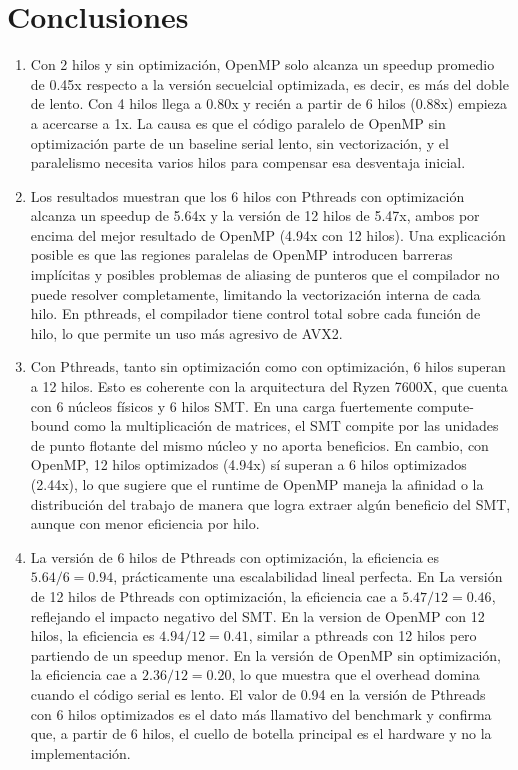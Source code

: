 
\section{Conclusiones}
\label{sec:Conclusiones}

\begin{enumerate}

 \item Con 2 hilos y sin optimización, OpenMP solo alcanza un speedup promedio de 0.45x respecto a la versión secuelcial optimizada, es decir, es más del doble de lento. Con 4 hilos llega a 0.80x y recién a partir de 6 hilos (0.88x) empieza a acercarse a 1x. La causa es que el código paralelo de OpenMP sin optimización parte de un baseline serial lento, sin vectorización, y el paralelismo necesita varios hilos para compensar esa desventaja inicial.

    \item Los resultados muestran que los 6 hilos con Pthreads con optimización alcanza un speedup de 5.64x y la versión de 12 hilos de 5.47x, ambos por encima del mejor resultado de OpenMP (4.94x con 12 hilos). Una explicación posible es que las regiones paralelas de OpenMP introducen barreras implícitas y posibles problemas de aliasing de punteros que el compilador no puede resolver completamente, limitando la vectorización interna de cada hilo. En pthreads, el compilador tiene control total sobre cada función de hilo, lo que permite un uso más agresivo de AVX2.

    \item Con Pthreads, tanto sin optimización como con optimización, 6 hilos superan a 12 hilos. Esto es coherente con la arquitectura del Ryzen 7600X, que cuenta con 6 núcleos físicos y 6 hilos SMT. En una carga fuertemente compute-bound como la multiplicación de matrices, el SMT compite por las unidades de punto flotante del mismo núcleo y no aporta beneficios. En cambio, con OpenMP, 12 hilos optimizados (4.94x) sí superan a 6 hilos optimizados (2.44x), lo que sugiere que el runtime de OpenMP maneja la afinidad o la distribución del trabajo de manera que logra extraer algún beneficio del SMT, aunque con menor eficiencia por hilo.

    \item La versión de 6 hilos de Pthreads con optimización, la eficiencia es $5.64 / 6 = 0.94$, prácticamente una escalabilidad lineal perfecta. En La versión de 12 hilos de Pthreads con optimización, la eficiencia cae a $5.47 / 12 = 0.46$, reflejando el impacto negativo del SMT. En la version de OpenMP con 12 hilos, la eficiencia es $4.94 / 12 = 0.41$, similar a pthreads con 12 hilos pero partiendo de un speedup menor. En la versión de OpenMP sin optimización, la eficiencia cae a $2.36 / 12 = 0.20$, lo que muestra que el overhead domina cuando el código serial es lento. El valor de 0.94 en la versión de Pthreads con 6 hilos optimizados es el dato más llamativo del benchmark y confirma que, a partir de 6 hilos, el cuello de botella principal es el hardware y no la implementación.


\end{enumerate}
